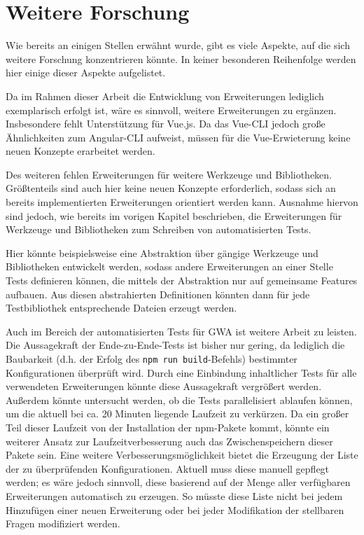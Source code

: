 \section{Weitere Forschung}
\label{further_research}

Wie bereits an einigen Stellen erwähnt wurde, gibt es viele Aspekte, auf die sich weitere Forschung konzentrieren könnte. In keiner besonderen Reihenfolge werden hier einige dieser Aspekte aufgelistet.

Da im Rahmen dieser Arbeit die Entwicklung von Erweiterungen lediglich exemplarisch erfolgt ist, wäre es sinnvoll, weitere Erweiterungen zu ergänzen. Insbesondere fehlt Unterstützung für Vue.js. Da das Vue-\gls{CLI} jedoch große Ähnlichkeiten zum Angular-\gls{CLI} aufweist, müssen für die Vue-Erwieterung keine neuen Konzepte erarbeitet werden.

Des weiteren fehlen Erweiterungen für weitere Werkzeuge und Bibliotheken. Größtenteils sind auch hier keine neuen Konzepte erforderlich, sodass sich an bereits implementierten Erweiterungen orientiert werden kann. Ausnahme hiervon sind jedoch, wie bereits im vorigen Kapitel beschrieben, die Erweiterungen für Werkzeuge und Bibliotheken zum Schreiben von automatisierten Tests.

Hier könnte beispielsweise eine Abstraktion über gängige Werkzeuge und Bibliotheken entwickelt werden, sodass andere Erweiterungen an einer Stelle Tests definieren können, die mittels der Abstraktion nur auf gemeinsame Features aufbauen. Aus diesen abstrahierten Definitionen könnten dann für jede Testbibliothek entsprechende Dateien erzeugt werden.

Auch im Bereich der automatisierten Tests für \gls{GWA} ist weitere Arbeit zu leisten. Die Aussagekraft der Ende-zu-Ende-Tests ist bisher nur gering, da lediglich die Baubarkeit (d.h. der Erfolg des \verb/npm run build/-Befehls) bestimmter Konfigurationen überprüft wird. Durch eine Einbindung inhaltlicher Tests für alle verwendeten Erweiterungen könnte diese Aussagekraft vergrößert werden. Außerdem könnte untersucht werden, ob die Tests parallelisiert ablaufen können, um die aktuell bei ca. 20 Minuten liegende Laufzeit zu verkürzen. Da ein großer Teil dieser Laufzeit von der Installation der \gls{npm}-Pakete kommt, könnte ein weiterer Ansatz zur Laufzeitverbesserung auch das Zwischenspeichern dieser Pakete sein. Eine weitere Verbesserungsmöglichkeit bietet die Erzeugung der Liste der zu überprüfenden Konfigurationen. Aktuell muss diese manuell gepflegt werden; es wäre jedoch sinnvoll, diese basierend auf der Menge aller verfügbaren Erweiterungen automatisch zu erzeugen. So müsste diese Liste nicht bei jedem Hinzufügen einer neuen Erweiterung oder bei jeder Modifikation der stellbaren Fragen modifiziert werden.

